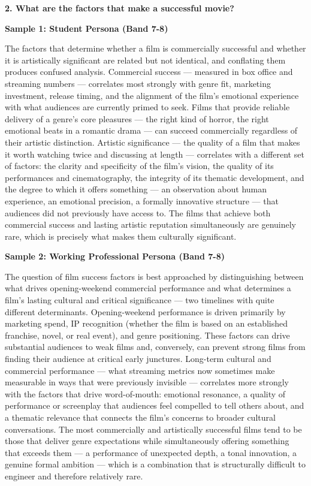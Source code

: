 \separator

\begin{ieltsquestion}
\textbf{2. What are the factors that make a successful movie?}
\end{ieltsquestion}
\textbf{Sample 1: Student Persona (Band 7-8)}

The factors that determine whether a film is commercially successful and whether it is artistically significant are related but not identical, and conflating them produces confused analysis. Commercial success — measured in box office and streaming numbers — correlates most strongly with genre fit, marketing investment, release timing, and the alignment of the film's emotional experience with what audiences are currently primed to seek. Films that provide reliable delivery of a genre's core pleasures — the right kind of horror, the right emotional beats in a romantic drama — can succeed commercially regardless of their artistic distinction. Artistic significance — the quality of a film that makes it worth watching twice and discussing at length — correlates with a different set of factors: the clarity and specificity of the film's vision, the quality of its performances and cinematography, the integrity of its thematic development, and the degree to which it offers something — an observation about human experience, an emotional precision, a formally innovative structure — that audiences did not previously have access to. The films that achieve both commercial success and lasting artistic reputation simultaneously are genuinely rare, which is precisely what makes them culturally significant.

\textbf{Sample 2: Working Professional Persona (Band 7-8)}

The question of film success factors is best approached by distinguishing between what drives opening-weekend commercial performance and what determines a film's lasting cultural and critical significance — two timelines with quite different determinants. Opening-weekend performance is driven primarily by marketing spend, IP recognition (whether the film is based on an established franchise, novel, or real event), and genre positioning. These factors can drive substantial audiences to weak films and, conversely, can prevent strong films from finding their audience at critical early junctures. Long-term cultural and commercial performance — what streaming metrics now sometimes make measurable in ways that were previously invisible — correlates more strongly with the factors that drive word-of-mouth: emotional resonance, a quality of performance or screenplay that audiences feel compelled to tell others about, and a thematic relevance that connects the film's concerns to broader cultural conversations. The most commercially and artistically successful films tend to be those that deliver genre expectations while simultaneously offering something that exceeds them — a performance of unexpected depth, a tonal innovation, a genuine formal ambition — which is a combination that is structurally difficult to engineer and therefore relatively rare.

